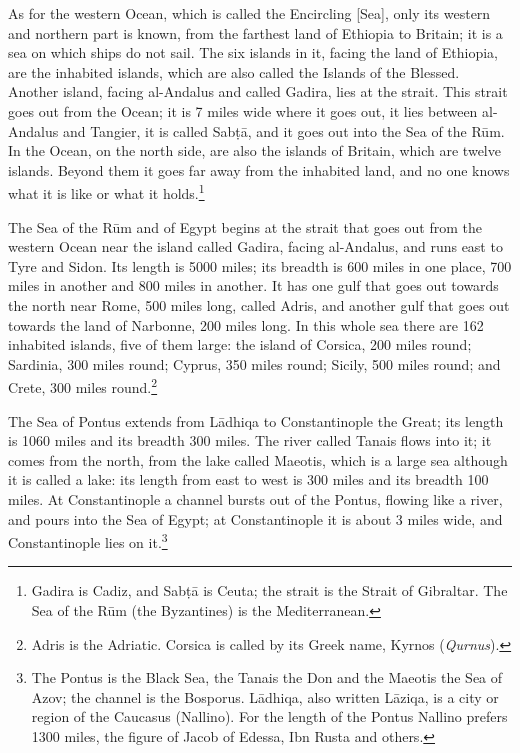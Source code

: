 \documentclass[11pt]{article}
\newcommand{\ArPage}[1]{\marginpar{\footnotesize\color{gray}Ar.\,p.\,#1}}
\begin{document}
\par As for the western Ocean, which is called the Encircling [Sea], only its western and northern part is known, from the farthest land of Ethiopia to Britain; it is a sea on which ships do not sail. The six islands in it, facing the land of Ethiopia, are the inhabited islands, which are also called the Islands of the Blessed. Another island, facing al-Andalus and called Gadira, lies at the strait. This strait goes out from the Ocean; it is 7 miles wide where it goes out, it lies between al-Andalus and Tangier, it is called Sabṭā, and it goes out into the Sea of the Rūm. In the Ocean, on the north side, are also the islands of Britain, which are twelve islands. Beyond them it goes far away from the inhabited land, and no one knows what it is like or what it holds.\footnote{Gadira is Cadiz, and Sabṭā is Ceuta; the strait is the Strait of Gibraltar. The Sea of the Rūm (the Byzantines) is the Mediterranean.}\par
\par \ArPage{27}The Sea of the Rūm and of Egypt begins at the strait that goes out from the western Ocean near the island called Gadira, facing al-Andalus, and runs east to Tyre and Sidon. Its length is 5000 miles; its breadth is 600 miles in one place, 700 miles in another and 800 miles in another. It has one gulf that goes out towards the north near Rome, 500 miles long, called Adris, and another gulf that goes out towards the land of Narbonne, 200 miles long. In this whole sea there are 162 inhabited islands, five of them large: the island of Corsica, 200 miles round; Sardinia, 300 miles round; Cyprus, 350 miles round; Sicily, 500 miles round; and Crete, 300 miles round.\footnote{Adris is the Adriatic. Corsica is called by its Greek name, Kyrnos (\emph{Qurnus}).}\par
\par The Sea of Pontus extends from Lādhiqa to Constantinople the Great; its length is 1060 miles and its breadth 300 miles. The river called Tanais flows into it; it comes from the north, from the lake called Maeotis, which is a large sea although it is called a lake: its length from east to west is 300 miles and its breadth 100 miles. At Constantinople a channel bursts out of the Pontus, flowing like a river, and pours into the Sea of Egypt; at Constantinople it is about 3 miles wide, and Constantinople lies on it.\footnote{The Pontus is the Black Sea, the Tanais the Don and the Maeotis the Sea of Azov; the channel is the Bosporus. Lādhiqa, also written Lāziqa, is a city or region of the Caucasus (Nallino). For the length of the Pontus Nallino prefers 1300 miles, the figure of Jacob of Edessa, Ibn Rusta and others.}\par
\end{document}

